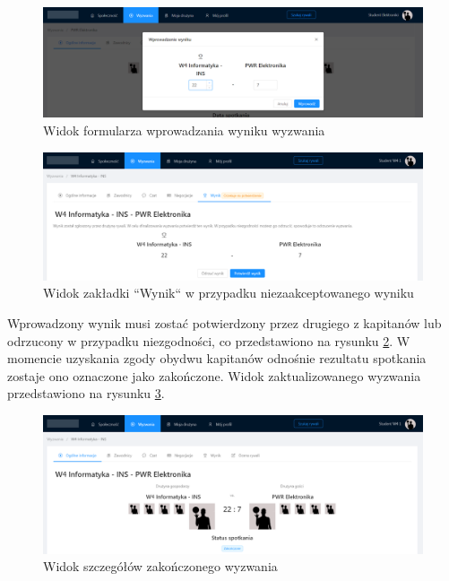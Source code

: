 \begin{figure}[H]
\centering
\includegraphics[width=\linewidth]{065-dzialanie/rys/ss-match-6.png}
\caption{Widok formularza wprowadzania wyniku wyzwania}
\label{fig:ss--match-6}
\end{figure}

\begin{figure}[H]
\centering
\includegraphics[width=\linewidth]{065-dzialanie/rys/ss-match-8.PNG}
\caption{Widok zakładki ``Wynik`` w przypadku niezaakceptowanego wyniku}
\label{fig:ss--match-8}
\end{figure}

Wprowadzony wynik musi zostać potwierdzony przez drugiego z kapitanów lub odrzucony w przypadku niezgodności, co przedstawiono na rysunku \ref{fig:ss--match-8}. W momencie uzyskania zgody obydwu kapitanów odnośnie rezultatu spotkania zostaje ono oznaczone jako zakończone. Widok zaktualizowanego wyzwania przedstawiono na rysunku \ref{fig:ss--match-9}.

\begin{figure}[H]
\centering
\includegraphics[width=\linewidth]{065-dzialanie/rys/ss-match-9.PNG}
\caption{Widok szczegółów zakończonego wyzwania}
\label{fig:ss--match-9}
\end{figure}

